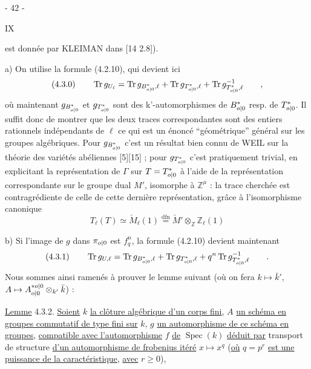 \begin{center}- 42 -\end{center}\hfill IX

est donnée par KLEIMAN dans [14 2.8]).

a) On utilise la formule (4.2.10), qui devient ici
\[
 (4.3.0)\qquad\operatorname{Tr}g_{U_\ell}
 =\operatorname{Tr}g_{B_{{o|0}}^*,\ell}+\operatorname{Tr}g_{T_{{o|0}}^*,\ell}
 +\operatorname{Tr}g^{-1}_{T_{{o|0}}^*,\ell}\qquad,
\]
où maintenant $g_{B_{{o|0}}^*}$ et $g_{T_{{o|0}}^*}$ sont des k'-automorphismes de $B_{{o|0}}^*$ resp. de $T_{{o|0}}^*$.
Il suffit donc de montrer que les deux traces correspondantes sont
des entiers rationnels indépendants de $\ell$ ce qui est un énoncé ``géométrique'' général sur les groupes algébriques. Pour $g_{B_{{o|0}}^*}$ c'est un résultat
bien connu de WEIL sur la théorie des variétés abéliennes [5\quad][15\quad] ;
pour $g_{T_{{o|0}}^*}$ c'est pratiquement trivial, en explicitant la représentation
de $\Gamma$ sur $T=T_{{o|0}}^*$ à l'aide de la représentation correspondante sur le groupe
dual $M'$, isomorphe à $\mathbb Z^\mu$ : la trace cherchée est contragrédiente de celle
de cette dernière représentation, grâce à l'isomorphisme canonique
\[
 T_\ell(T)\simeq\check M_\ell(1)\overset{\mathrm{dfn}}{=}
 \check M'\otimes_{\mathbb Z}\mathbb Z_\ell(1)
\]

b) Si l'image de $g$ dans $\pi_{{o|0}}$ est $f_q^n$, la formule (4.2.10)
devient maintenant
\[
 (4.3.1)\qquad\operatorname{Tr}g_{U,\ell}
 =\operatorname{Tr}g_{B_{{o|0}}^*,\ell}+\operatorname{Tr}g_{T_{{o|0}}^*,\ell}
 +q^n\operatorname{Tr}g^{-1}_{T_{{o|0}}^*,\ell}\qquad.
\]
Nous sommes ainsi ramenés à prouver le lemme suivant (où on fera $k\mapsto\bar k'$,
$A\mapsto A_{{o|0}}^{*{o|0}}\otimes_{k'}\bar k$) :

\uline{Lemme} 4.3.2. \uline{Soient} $k$ \uline{la clôture algébrique d'un corps fini}, $A$ \uline{un schéma
en groupes commutatif de type fini sur} $k$, $g$ \uline{un automorphisme de ce
schéma en groupes}, \uline{compatible avec l'automorphisme} $f$ \uline{de} $\operatorname{Spec}(k)$ \uline{déduit
par} transport de structure \uline{d'un automorphisme de frobenius itéré}
$x\mapsto x^q$ (\uline{où} $q=p^r$ \uline{est une puissance de la caractéristique}, \uline{avec} $r\geq0$),
